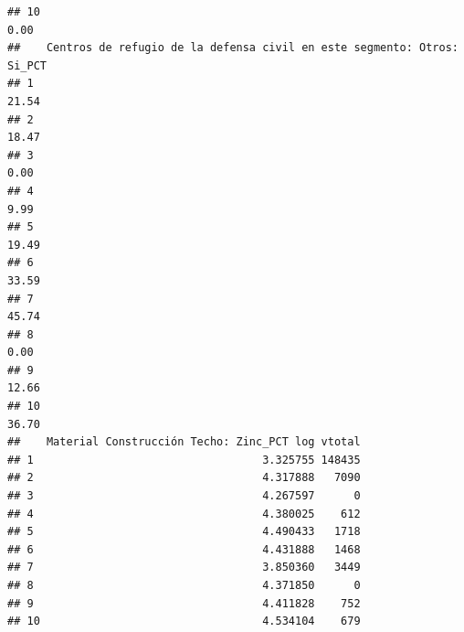 \documentclass[11pt,]{article}
\newenvironment{Shaded}{\begin{snugshade}}{\end{snugshade}}
\newcommand{\KeywordTok}[1]{\textcolor[rgb]{0.13,0.29,0.53}{\textbf{#1}}}
\newcommand{\DataTypeTok}[1]{\textcolor[rgb]{0.13,0.29,0.53}{#1}}
\newcommand{\StringTok}[1]{\textcolor[rgb]{0.31,0.60,0.02}{#1}}
\newcommand{\CommentTok}[1]{\textcolor[rgb]{0.56,0.35,0.01}{\textit{#1}}}
\newcommand{\OtherTok}[1]{\textcolor[rgb]{0.56,0.35,0.01}{#1}}
\newcommand{\OperatorTok}[1]{\textcolor[rgb]{0.81,0.36,0.00}{\textbf{#1}}}
\newcommand{\NormalTok}[1]{#1}
\begin{document}
\begin{verbatim}
## 10                                                                              0.00
##    Centros de refugio de la defensa civil en este segmento: Otros: Si_PCT
## 1                                                                   21.54
## 2                                                                   18.47
## 3                                                                    0.00
## 4                                                                    9.99
## 5                                                                   19.49
## 6                                                                   33.59
## 7                                                                   45.74
## 8                                                                    0.00
## 9                                                                   12.66
## 10                                                                  36.70
##    Material Construcción Techo: Zinc_PCT log vtotal
## 1                                   3.325755 148435
## 2                                   4.317888   7090
## 3                                   4.267597      0
## 4                                   4.380025    612
## 5                                   4.490433   1718
## 6                                   4.431888   1468
## 7                                   3.850360   3449
## 8                                   4.371850      0
## 9                                   4.411828    752
## 10                                  4.534104    679
\end{verbatim}

\begin{Shaded}
\end{Shaded}
\end{document}
